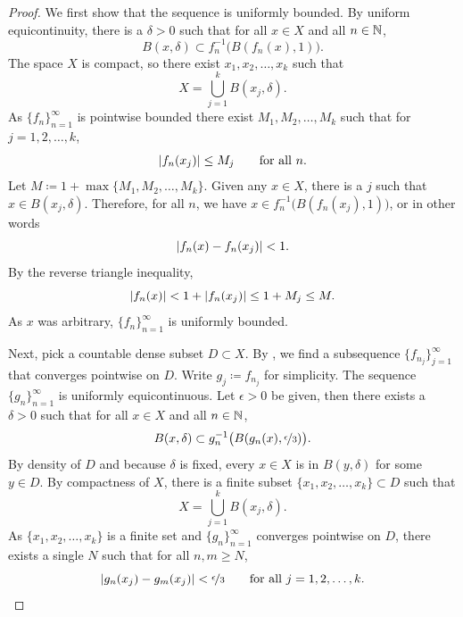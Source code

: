 \begin{proof}
We first show that the sequence is uniformly bounded.
By uniform equicontinuity,
there is a $\delta > 0$
such that
for all $x \in X$ and all $n \in {\mathbb{N}}$,
\begin{equation*}
B(x,\delta) \subset f_n^{-1}\bigl(B(f_n(x),1)\bigr) .
\end{equation*}
The space $X$ is compact, so there exist $x_1,x_2,\ldots,x_k$
such that
\begin{equation*}
X = \bigcup_{j=1}^k B(x_j,\delta) .
\end{equation*}
As $\{ f_n \}_{n=1}^\infty$ is pointwise bounded there exist $M_1,M_2,\ldots,M_k$
such that for $j=1,2,\ldots,k$,
\begin{equation*}
\lvert {f_n(x_j)} \rvert \leq M_j \qquad \text{for all } n.
\end{equation*}
Let $M \coloneqq 1+ \max \{ M_1,M_2,\ldots,M_k \}$.  Given any
$x \in X$, there is a $j$ such that $x \in B(x_j,\delta)$.  Therefore,
for all $n$, we have
$x \in f_n^{-1}\bigl(B(f_n(x_j),1)\bigr)$, or in other words
\begin{equation*}
\lvert {f_n(x)-f_n(x_j)} \rvert < 1 .
\end{equation*}
By the reverse triangle inequality,
\begin{equation*}
\lvert {f_n(x)} \rvert < 1+ \lvert {f_n(x_j)} \rvert \leq 1+M_j \leq M .
\end{equation*}
As $x$ was arbitrary, $\{f_n\}_{n=1}^\infty$ is uniformly bounded.


Next, pick a countable dense subset $D \subset X$.
By , we find
a subsequence $\{ f_{n_j} \}_{j=1}^\infty$ that converges pointwise on $D$.
Write $g_j \coloneqq f_{n_j}$ for simplicity.
The sequence $\{ g_n \}_{n=1}^\infty$ is 
uniformly equicontinuous.
Let $\epsilon > 0$ be given, then there exists a $\delta > 0$
such that for all $x \in X$ and all $n \in {\mathbb{N}}$,
\begin{equation*}
B(x,\delta) \subset g_n^{-1}\bigl(B(g_n(x),\nicefrac{\epsilon}{3})\bigr).
\end{equation*}
By density of $D$ and because $\delta$ is fixed, every $x \in X$ is in $B(y,\delta)$
for some $y \in D$.  By compactness of $X$,
there is a finite subset $\{ x_1,x_2,\ldots,x_k \} \subset D$
such that
\begin{equation*}
X = \bigcup_{j=1}^k B(x_j,\delta) .
\end{equation*}
As $\{ x_1,x_2,\ldots,x_k \}$
is a finite set and $\{ g_n \}_{n=1}^\infty$
converges pointwise on $D$, there exists a single $N$ such that for 
all $n,m \geq N$,
\begin{equation*}
\lvert {g_n(x_j)-g_m(x_j)} \rvert < \nicefrac{\epsilon}{3}
 \qquad \text{for all } j=1,2,\ldots,k.
\end{equation*}


\end{proof}
